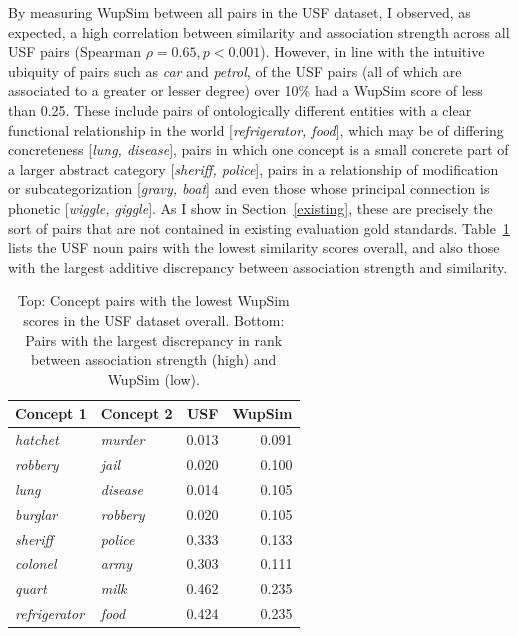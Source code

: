 By measuring WupSim between all pairs in the USF dataset, I observed, as expected, a high correlation between similarity and association strength across all USF pairs (Spearman \( \rho= 0.65, p<0.001 \)). However, in line with the intuitive ubiquity of pairs such as \emph{car} and \emph{petrol}, of the USF pairs (all of which are associated to a greater or lesser degree) over 10\% had a WupSim score of less than 0.25. These include pairs of ontologically different entities with a clear functional relationship in the world [\emph{refrigerator, food}], which may be of differing concreteness [\emph{lung, disease}], pairs in which one concept is a small concrete part of a larger abstract category [\emph{sheriff, police}], pairs in a relationship of modification or subcategorization [\emph{gravy, boat}] and even those whose principal connection is phonetic [\emph{wiggle, giggle}]. As I show in Section~\ref{existing}, these are precisely the sort of pairs that are not contained in existing evaluation gold standards. Table~\ref{tab1} lists the USF noun pairs with the lowest similarity scores overall, and also those with the largest additive discrepancy between association strength and similarity.

\begin{table}[t]\begin{center}\begin{tabular}{l|l|r|r}
Concept 1 & Concept 2 & USF & WupSim \\
\hline \emph{hatchet} & \emph{murder} & 0.013 & 0.091 \\
\emph{robbery} & \emph{jail} & 0.020 & 0.100 \\
\emph{lung} & \emph{disease} & 0.014 & 0.105 \\
\emph{burglar} & \emph{robbery}& 0.020 & 0.105\\
\hdashline \emph{sheriff} & \emph{police} & 0.333 & 0.133 \\
\emph{colonel} & \emph{army} & 0.303 & 0.111 \\
\emph{quart}& \emph{milk} & 0.462 & 0.235 \\
\emph{refrigerator} & \emph{food} & 0.424 & 0.235\\
\end{tabular}\end{center}\caption{\label{tab1} Top: Concept pairs with the lowest WupSim scores in the USF dataset overall. Bottom: Pairs with the largest discrepancy in rank between association strength (high) and WupSim (low).}\end{table}

